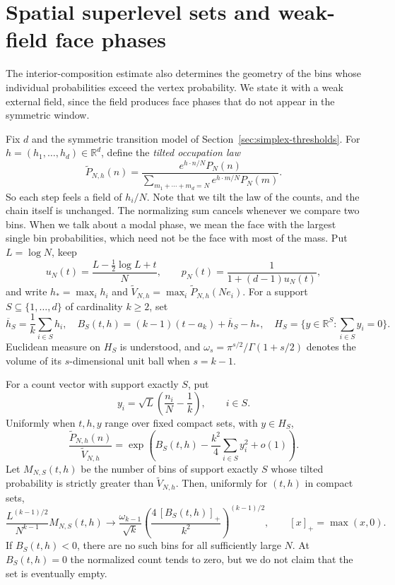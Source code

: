 \section{Spatial superlevel sets and weak-field face phases}\label{sec:frontier-modes}

The interior-composition estimate also determines the geometry of the bins
whose individual probabilities exceed the vertex probability. We state it
with a weak external field, since the field produces face phases that do
not appear in the symmetric window.

Fix $d$ and the symmetric transition model of
Section~\ref{sec:simplex-thresholds}. For $h=(h_1,\ldots,h_d)\in\mathbb R^d$,
define the \emph{tilted occupation law}
\begin{equation}\label{eq:weakfield-law}
 \widetilde P_{N,h}(n)=
 \frac{e^{h\cdot n/N}P_N(n)}
 {\sum_{m_1+\cdots+m_d=N}e^{h\cdot m/N}P_N(m)}.
\end{equation}
So each step feels a field of $h_i/N$. Note that we tilt the law of the
counts, and the chain itself is unchanged. The normalizing sum cancels
whenever we compare two bins. When we talk about a modal phase, we mean
the face with the largest single bin probabilities, which need not be the
face with most of the mass. Put $L=\log N$, keep
\[
 u_N(t)=\frac{L-\tfrac12\log L+t}{N},\qquad
 p_N(t)=\frac{1}{1+(d-1)u_N(t)},
\]
and write $h_* =\max_i h_i$ and
$\widetilde V_{N,h}=\max_i\widetilde P_{N,h}(Ne_i)$.
For a support $S\subseteq\{1,\ldots,d\}$ of cardinality $k\ge2$, set
\[
 \overline h_S=\frac1k\sum_{i\in S}h_i,
 \quad B_S(t,h)=(k-1)(t-a_k)+\overline h_S-h_*,
 \quad H_S=\{y\in\mathbb R^S:\textstyle\sum_{i\in S}y_i=0\}.
\]
Euclidean measure on $H_S$ is understood, and
$\omega_s=\pi^{s/2}/\Gamma(1+s/2)$ denotes the volume of its
$s$-dimensional unit ball when $s=k-1$.

\begin{theorem}\label{thm:frontier-superlevel}
For a count vector with support exactly $S$, put
\[
 y_i=\sqrt L\left(\frac{n_i}{N}-\frac1k\right),\qquad i\in S.
\]
Uniformly when $t,h,y$ range over fixed compact sets, with $y\in H_S$,
\begin{equation}\label{eq:frontier-profile}
 \frac{\widetilde P_{N,h}(n)}{\widetilde V_{N,h}}
 =\exp\left(B_S(t,h)-\frac{k^2}{4}\sum_{i\in S}y_i^2+o(1)\right).
\end{equation}
Let $M_{N,S}(t,h)$ be the number of bins of support exactly $S$ whose
tilted probability is strictly greater than $\widetilde V_{N,h}$. Then,
uniformly for $(t,h)$ in compact sets,
\begin{equation}\label{eq:frontier-volume}
 \frac{L^{(k-1)/2}}{N^{k-1}}M_{N,S}(t,h)
 \longrightarrow
 \frac{\omega_{k-1}}{\sqrt k}
 \left(\frac{4\,[B_S(t,h)]_+}{k^2}\right)^{(k-1)/2},
 \qquad [x]_+=\max(x,0).
\end{equation}
If $B_S(t,h)<0$, there are no such bins for all sufficiently large $N$.
At $B_S(t,h)=0$ the normalized count tends to zero, but we do not claim
that the set is eventually empty.
\end{theorem}

